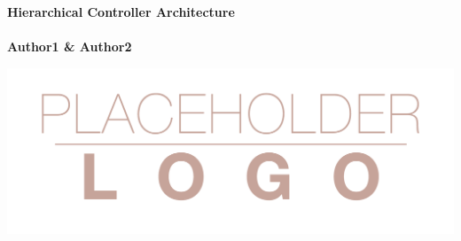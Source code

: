 \documentclass[a0,portrait]{a0poster}
\begin{document}


\begin{minipage}[b]{0.75\linewidth}
\veryHuge \color{NavyBlue} \textbf{Hierarchical Controller Architecture} \color{Black}\\ %
\Huge\color{NavyBlue}\\[1cm] %
\huge \textbf{Author1 \& Author2}\\[0.5cm] %
\end{minipage}
%
\begin{minipage}[b]{0.25\linewidth}
\includegraphics[width=20cm]{logo.png}\\
\end{minipage}

\vspace{1cm} %

\end{document}
